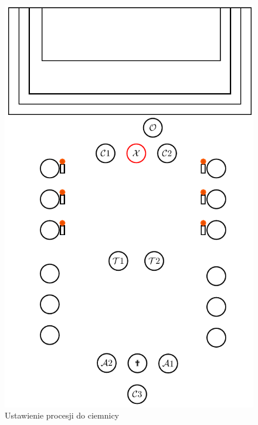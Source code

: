 \begin{figure}[h]
      \centering
      \begin{minipage}{0.33\linewidth}
            \centering
            \includegraphics[width=\linewidth]{Figures/Czwartek/Procesja2.pdf}
            \caption{Ustawienie procesji do ciemnicy}
            \label{fig:procesja1_czw}
      \end{minipage}
      \hfill
      \begin{minipage}{0.6\linewidth}
            \centering

\end{minipage}
\end{figure}
